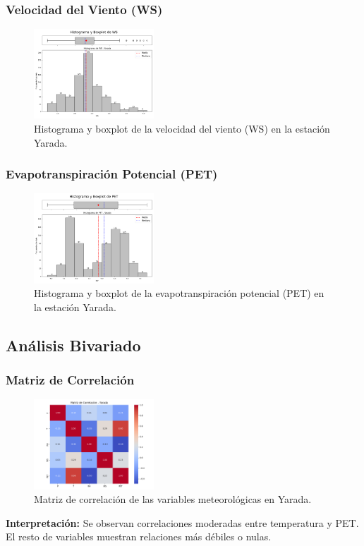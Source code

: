 \subsubsection*{Velocidad del Viento (WS)}
\begin{figure}[H]
\centering
\includegraphics[width=0.4\textwidth]{resultados/por_estacion_meteorologica/Yarada/WS_histograma.png}
\caption{Histograma y boxplot de la velocidad del viento (WS) en la estación Yarada.}
\label{fig:yarada_WS}
\end{figure}

\subsubsection*{Evapotranspiración Potencial (PET)}
\begin{figure}[H]
\centering
\includegraphics[width=0.4\textwidth]{resultados/por_estacion_meteorologica/Yarada/PET_histograma.png}
\caption{Histograma y boxplot de la evapotranspiración potencial (PET) en la estación Yarada.}
\label{fig:yarada_PET}
\end{figure}

\subsection{Análisis Bivariado}

\subsubsection*{Matriz de Correlación}
\begin{figure}[H]
\centering
\includegraphics[width=0.4\textwidth]{resultados/por_estacion_meteorologica/Yarada/matriz_correlacion.png}
\caption{Matriz de correlación de las variables meteorológicas en Yarada.}
\label{fig:yarada_corr}
\end{figure}
\textbf{Interpretación:} Se observan correlaciones moderadas entre temperatura y PET. El resto de variables muestran relaciones más débiles o nulas.

